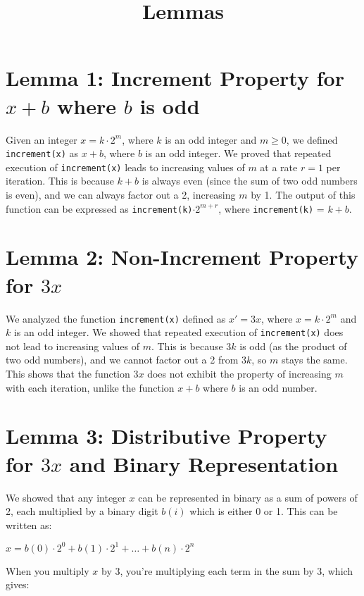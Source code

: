 \documentclass{article}
\begin{document}
\title{Lemmas}
\maketitle

\section{Lemma 1: Increment Property for \(x + b\) where \(b\) is odd}

Given an integer \(x = k \cdot 2^m\), where \(k\) is an odd integer and \(m \geq 0\), we defined \texttt{increment(x)} as \(x + b\), where \(b\) is an odd integer. We proved that repeated execution of \texttt{increment(x)} leads to increasing values of \(m\) at a rate \(r = 1\) per iteration. This is because \(k + b\) is always even (since the sum of two odd numbers is even), and we can always factor out a 2, increasing \(m\) by 1. The output of this function can be expressed as \texttt{increment(k)}\( \cdot 2^{m+r}\), where \texttt{increment(k)} = \(k + b\).

\section{Lemma 2: Non-Increment Property for \(3x\)}

We analyzed the function \texttt{increment(x)} defined as \(x' = 3x\), where \(x = k \cdot 2^m\) and \(k\) is an odd integer. We showed that repeated execution of \texttt{increment(x)} does not lead to increasing values of \(m\). This is because \(3k\) is odd (as the product of two odd numbers), and we cannot factor out a 2 from \(3k\), so \(m\) stays the same. This shows that the function \(3x\) does not exhibit the property of increasing \(m\) with each iteration, unlike the function \(x + b\) where \(b\) is an odd number.

\section{Lemma 3: Distributive Property for \(3x\) and Binary Representation}

We showed that any integer \(x\) can be represented in binary as a sum of powers of 2, each multiplied by a binary digit \(b(i)\) which is either 0 or 1. This can be written as:

\(x = b(0) \cdot 2^0 + b(1) \cdot 2^1 + \ldots + b(n) \cdot 2^n\)

When you multiply \(x\) by 3, you're multiplying each term in the sum by 3, which gives:
\end{document}
